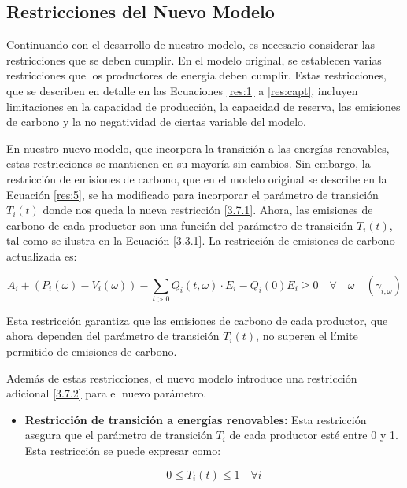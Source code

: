 \subsection{Restricciones del Nuevo Modelo}\label{c37}

Continuando con el desarrollo de nuestro modelo, es necesario considerar las restricciones que se deben cumplir. En el modelo original, se establecen varias restricciones que los productores de energía deben cumplir. Estas restricciones, que se describen en detalle en las Ecuaciones \ref{res:1} a \ref{res:capt}, incluyen limitaciones en la capacidad de producción, la capacidad de reserva, las emisiones de carbono y la no negatividad de ciertas variable del modelo.\vspace{2.5mm}

En nuestro nuevo modelo, que incorpora la transición a las energías renovables, estas restricciones se mantienen en su mayoría sin cambios. Sin embargo, la restricción de emisiones de carbono, que en el modelo original se describe en la Ecuación \ref{res:5}, se ha modificado para incorporar el parámetro de transición \( T_i(t) \) donde nos queda la nueva restricción \ref{3.7.1}. Ahora, las emisiones de carbono de cada productor son una función del parámetro de transición \( T_i(t) \), tal como se ilustra en la Ecuación \ref{3.3.1}. La restricción de emisiones de carbono actualizada es:

\begin{equation}
A_{i} + (P_i(\omega) - V_i(\omega))-\sum_{t>0}Q_i(t, \omega)\cdot E_{i}-Q_i(0)E_{i} \geq 0 \quad \forall \quad \omega \quad (\gamma_{i,\omega})\label{3.7.1}
\end{equation}

Esta restricción garantiza que las emisiones de carbono de cada productor, que ahora dependen del parámetro de transición \( T_i(t) \), no superen el límite permitido de emisiones de carbono.\vspace{2.5mm}

Además de estas restricciones, el nuevo modelo introduce una restricción adicional \ref{3.7.2} para el nuevo parámetro.

\begin{itemize}
\item \textbf{Restricción de transición a energías renovables:} Esta restricción asegura que el parámetro de transición $T_i$ de cada productor esté entre 0 y 1. Esta restricción se puede expresar como:

\begin{equation}
0 \leq T_i(t) \leq 1 \quad \forall i\label{3.7.2}
\end{equation}
\end{itemize}

